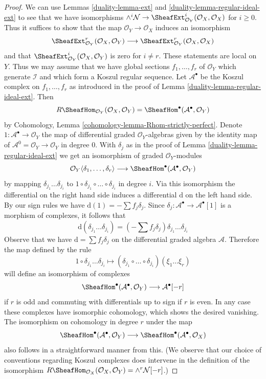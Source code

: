 \begin{proof}

We can use Lemmas \ref{duality-lemma-ext} and \ref{duality-lemma-regular-ideal-ext}
to see that we have isomorphisms
$\wedge^i\mathcal{N} \to
\SheafExt^i_{\mathcal{O}_Y}(\mathcal{O}_X, \mathcal{O}_X)$
for $i \geq 0$. Thus it suffices to show that the map
$\mathcal{O}_Y \to \mathcal{O}_X$ induces an isomorphism
$$
\SheafExt^r_{\mathcal{O}_Y}(\mathcal{O}_X, \mathcal{O}_Y)
\longrightarrow
\SheafExt^r_{\mathcal{O}_Y}(\mathcal{O}_X, \mathcal{O}_X)
$$
and that
$\SheafExt^i_{\mathcal{O}_Y}(\mathcal{O}_X, \mathcal{O}_Y)$
is zero for $i \not = r$. These statements are local on $Y$. Thus
we may assume that we have global sections $f_1, \ldots, f_r$ of
$\mathcal{O}_Y$ which generate $\mathcal{I}$ and which form a
Koszul regular sequence. Let $\mathcal{A}^\bullet$
be the Koszul complex on $f_1, \ldots, f_r$ as introduced in the proof of
Lemma \ref{duality-lemma-regular-ideal-ext}. Then
$$
R\SheafHom_{\mathcal{O}_Y}(\mathcal{O}_X, \mathcal{O}_Y) =
\SheafHom^\bullet(\mathcal{A}^\bullet, \mathcal{O}_Y)
$$
by Cohomology, Lemma \ref{cohomology-lemma-Rhom-strictly-perfect}.
Denote $1 : \mathcal{A}^\bullet \to \mathcal{O}_Y$ the map of differential
graded $\mathcal{O}_Y$-algebras given by the identity map of
$\mathcal{A}^0 = \mathcal{O}_Y \to \mathcal{O}_Y$ in degree $0$.
With $\delta_j$ as in the proof of Lemma \ref{duality-lemma-regular-ideal-ext}
we get an isomorphism of graded $\mathcal{O}_Y$-modules
$$
\mathcal{O}_Y\langle \delta_1, \ldots, \delta_r\rangle
\longrightarrow
\SheafHom^\bullet(\mathcal{A}^\bullet, \mathcal{O}_Y)
$$
by mapping $\delta_{j_1} \ldots \delta_{j_i}$ to
$1 \circ \delta_{j_1} \circ \ldots \circ \delta_{j_i}$ in degree $i$.
Via this isomorphism the differential on the right hand side
induces a differential $\text{d}$ on the left hand side.
By our sign rules we have $\text{d}(1) = - \sum f_j \delta_j$.
Since $\delta_j : \mathcal{A}^\bullet \to \mathcal{A}^\bullet[1]$
is a morphism of complexes, it follows that
$$
\text{d}(\delta_{j_1} \ldots \delta_{j_i}) =
(- \sum f_j \delta_j )\delta_{j_1} \ldots \delta_{j_i}
$$
Observe that we have $\text{d} = \sum f_j \delta_j$ on the differential
graded algebra $\mathcal{A}$. Therefore the map defined by the rule
$$
1 \circ \delta_{j_1} \ldots \delta_{j_i} \longmapsto
(\delta_{j_1} \circ \ldots \circ \delta_{j_i})(\xi_1 \ldots \xi_r)
$$
will define an isomorphism of complexes
$$
\SheafHom^\bullet(\mathcal{A}^\bullet, \mathcal{O}_Y)
\longrightarrow \mathcal{A}^\bullet[-r]
$$
if $r$ is odd and commuting with differentials up to sign if $r$ is even.
In any case these complexes have isomorphic cohomology, which shows the
desired vanishing. The isomorphism on cohomology in degree $r$
under the map
$$
\SheafHom^\bullet(\mathcal{A}^\bullet, \mathcal{O}_Y)
\longrightarrow
\SheafHom^\bullet(\mathcal{A}^\bullet, \mathcal{O}_X)
$$
also follows in a straightforward manner from this.
(We observe that our choice of conventions regarding
Koszul complexes does intervene in the definition
of the isomorphism
$R\SheafHom_{\mathcal{O}_X}(\mathcal{O}_X, \mathcal{O}_Y) =
\wedge^r \mathcal{N}[-r]$.)
\end{proof}

